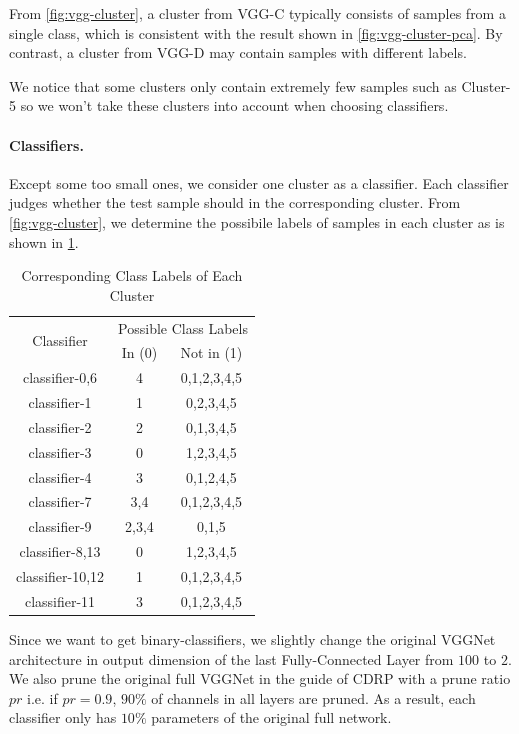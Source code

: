 \documentclass[sigplan,10pt,review]{acmart}\settopmatter{printfolios=true,printccs=false,printacmref=false}
\begin{document}
From \cref{fig:vgg-cluster}, a cluster from VGG-C typically consists of samples from a single class, which is consistent with the result shown in \cref{fig:vgg-cluster-pca}. 
By contrast, a cluster from VGG-D may contain samples with different labels.

We notice that some clusters only contain extremely few samples such as Cluster-5 so we won't take these clusters into account when choosing classifiers.

\paragraph{Classifiers.} Except some too small ones, we consider one cluster as a classifier. Each classifier judges whether the test sample should in the corresponding cluster. 
From \cref{fig:vgg-cluster}, we determine the possibile labels of samples in each cluster as is shown in \cref{tab:cluster_label}. 

\begin{table}[h]
	\caption{Corresponding Class Labels of Each Cluster}
	\label{tab:cluster_label}
	\begin{tabular}{|c|c|c|}
	\hline
	\multirow{2}{*}{Classifier} &\multicolumn{2}{c|}{Possible Class Labels}\\
	\cline{2-3}
	& In (0) & Not in (1)\\
	\hline
	classifier-0,6 & 4 & 0,1,2,3,4,5\\
	classifier-1 & 1 & 0,2,3,4,5\\
	classifier-2 & 2 & 0,1,3,4,5\\
	classifier-3 & 0 & 1,2,3,4,5\\
	classifier-4 & 3 & 0,1,2,4,5\\
	classifier-7 & 3,4 & 0,1,2,3,4,5\\ 
	classifier-9 & 2,3,4 & 0,1,5\\ 
	classifier-8,13 & 0 & 1,2,3,4,5\\
	classifier-10,12 & 1 & 0,1,2,3,4,5\\
	classifier-11 & 3 & 0,1,2,3,4,5\\
	\hline
	\end{tabular}
\end{table}

Since we want to get binary-classifiers, we slightly change the original VGGNet architecture in output dimension of the last Fully-Connected Layer from $100$ to $2$. 
We also prune the original full VGGNet in the guide of CDRP with a prune ratio $pr$ i.e. if $pr=0.9$, $90\%$ of channels in all layers are pruned. 
As a result, each classifier only has $10\%$ parameters of the original full network.
\end{document}
